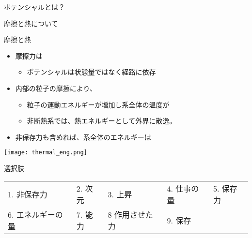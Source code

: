 \documentclass[uplatex,dvipdfmx,a4paper,11pt]{jsarticle}
\begin{document}
\begin{qlist}
\begin{qlist2}
\begin{itembox}[l]{ポテンシャルとは？}
				\end{itembox}
			\qitem 摩擦と熱について
			\begin{center}
				\begin{minipage}{0.5\textwidth}
					\begin{itembox}[l]{摩擦と熱}
						\begin{itemize}
							\item 摩擦力は\qbox{}
								\begin{itemize}
									\item ポテンシャルは状態量ではなく経路に依存
								\end{itemize}
							\item 内部の粒子の摩擦により、
								\begin{itemize}
									\item 粒子の運動エネルギーが増加し系全体の温度が\qbox{}
									\item 非断熱系では、熱エネルギーとして外界に散逸。
								\end{itemize}
							\item 非保存力も含めれば、系全体のエネルギーは\qbox{}
						\end{itemize}
					\end{itembox}
				\end{minipage}
				\begin{minipage}{0.34\textwidth}
					\begin{center}
					\texttt{[image: thermal\_eng.png]}
					\end{center}
				\end{minipage}
			\end{center}
		\end{qlist2}
	\begin{itembox}[l]{選択肢}
		\begin{center}
			\begin{tabular}{lllll}
				1. 非保存力	&2. 次元	&3. 上昇	&4. 仕事の量 &5. 保存力\\
				6. エネルギーの量	&7. 能力	&8 作用させた力 &9. 保存
			\end{tabular}
		\end{center}
	\end{itembox}
\end{qlist}
\end{document}
